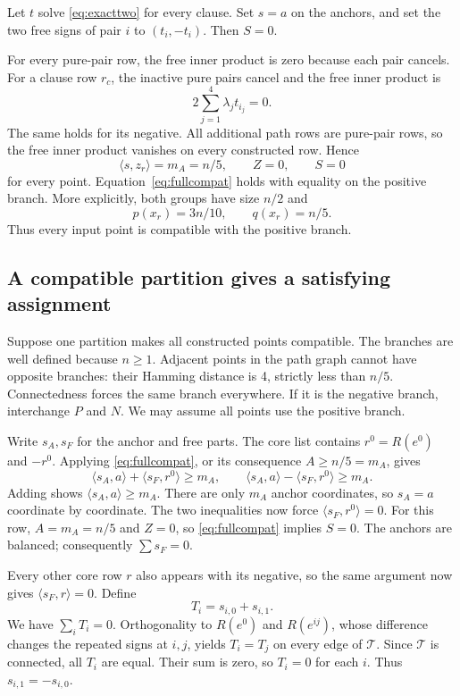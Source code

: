 \documentclass[11pt,a4paper]{article}
\theoremstyle{remark}
\newcommand{\ip}[2]{\langle #1,#2\rangle}
\newcommand{\1}{\mathbf 1}
\begin{document}
Let $t$ solve \eqref{eq:exacttwo} for every clause. Set $s=a$ on the anchors,
and set the two free signs of pair $i$ to $(t_i,-t_i)$. Then $S=0$.

For every pure-pair row, the free inner product is zero because each pair
cancels. For a clause row $r_c$, the inactive pure pairs cancel and the
free inner product is
\[
 2\sum_{j=1}^4\lambda_j t_{i_j}=0.
\]
The same holds for its negative. All additional path rows are pure-pair rows,
so the free inner product vanishes on every constructed row. Hence
\[
 \ip{s}{z_r}=m_A=n/5,\qquad Z=0,\qquad S=0
\]
for every point. Equation~\eqref{eq:fullcompat} holds with equality on the
positive branch. More explicitly, both groups have size $n/2$ and
\[
 p(x_r)=3n/10,\qquad q(x_r)=n/5.
\]
Thus every input point is compatible with the positive branch.

\subsection{A compatible partition gives a satisfying assignment}

Suppose one partition makes all constructed points compatible. The branches
are well defined because $n\ge1$. Adjacent points in the path graph cannot
have opposite branches: their Hamming distance is 4, strictly less than $n/5$.
Connectedness forces the same branch everywhere. If it is the negative
branch, interchange $P$ and $N$. We may assume all points use the positive
branch.

Write $s_A,s_F$ for the anchor and free parts. The core list contains
$r^0=R(e^0)$ and $-r^0$. Applying \eqref{eq:fullcompat}, or its consequence
$A\ge n/5=m_A$, gives
\[
 \ip{s_A}{a}+\ip{s_F}{r^0}\ge m_A,\qquad
 \ip{s_A}{a}-\ip{s_F}{r^0}\ge m_A.
\]
Adding shows $\ip{s_A}{a}\ge m_A$. There are only $m_A$ anchor coordinates,
so $s_A=a$ coordinate by coordinate. The two inequalities now force
$\ip{s_F}{r^0}=0$. For this row, $A=m_A=n/5$ and $Z=0$, so
\eqref{eq:fullcompat} implies $S=0$. The anchors are balanced; consequently
$\sum s_F=0$.

Every other core row $r$ also appears with its negative, so the same argument
now gives $\ip{s_F}{r}=0$. Define
\[
 T_i=s_{i,0}+s_{i,1}.
\]
We have $\sum_iT_i=0$. Orthogonality to $R(e^0)$ and $R(e^{ij})$, whose
difference changes the repeated signs at $i,j$, yields $T_i=T_j$ on every
edge of $\mathcal T$. Since $\mathcal T$ is connected, all $T_i$ are equal.
Their sum is zero, so $T_i=0$ for each $i$. Thus
$s_{i,1}=-s_{i,0}$.
\end{document}
